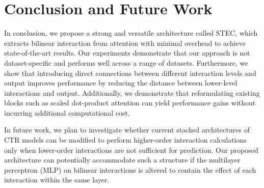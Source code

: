 \documentclass{article}
\begin{document}
\section{Conclusion and Future Work}

In conclusion, we propose a strong and versatile architecture called STEC, which extracts bilinear interaction from attention with minimal overhead to achieve state-of-the-art results. Our experiments demonstrate that our approach is not dataset-specific and performs well across a range of datasets. Furthermore, we show that introducing direct connections between different interaction levels and output improves performance by reducing the distance between lower-level interactions and output. Additionally, we demonstrate that reformulating existing blocks such as scaled dot-product attention can yield performance gains without incurring additional computational cost.

In future work, we plan to investigate whether current stacked architectures of CTR models can be modified to perform higher-order interaction calculations only when lower-order interactions are not sufficient for prediction. Our proposed architecture can potentially accommodate such a structure if the multilayer perceptron (MLP) on bilinear interactions is altered to contain the effect of each interaction within the same layer.

  
  
\end{document}
